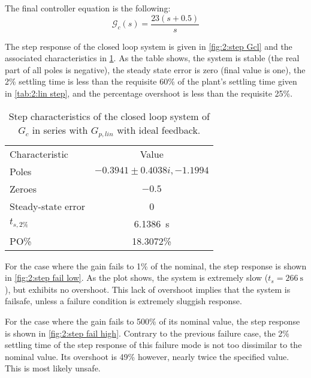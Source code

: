 The final controller equation is the following:
\begin{equation}
	\label{eq:2:Gc}
	\mathcal{G}_c(s) = \frac{23(s+0.5)}{s}
\end{equation}

The step response of the closed loop system is given in \cref{fig:2:step Gcl} and the associated characteristics in \cref{tab:2:step Gcl}. As the table shows, the system is stable (the real part of all poles is negative), the steady state error is zero (final value is one), the 2\% settling time is less than the requisite 60\% of the plant's settling time given in \cref{tab:2:lin step}, and the percentage overshoot is less than the requisite 25\%.

\begin{table}[h]
	\centering
	\begin{tabular}{lc}
		\toprule
		Characteristic&Value\\
		\cmidrule(r){1-1}\cmidrule(l){2-2}
		Poles&$-0.3941\pm\num{0.4038i},-1.1994$\\
		Zeroes&$-0.5$\\
		Steady-state error&0\\
		$t_{s,2\%}$&\SI{6.1386}{\second}\\
		PO\%&18.3072\%\\
		\bottomrule
	\end{tabular}
	\caption{Step characteristics of the closed loop system of $G_c$ in series with $G_{p,lin}$ with ideal feedback.}
	\label{tab:2:step Gcl}
\end{table}


For the case where the gain fails to 1\% of the nominal, the step response is shown in \cref{fig:2:step fail low}. As the plot shows, the system is extremely slow ($t_s=\SI{266}{\second}$), but exhibits no overshoot. This lack of overshoot implies that the system is failsafe, unless a failure condition is extremely sluggish response.

For the case where the gain fails to 500\% of its nominal value, the step response is shown in \cref{fig:2:step fail high}. Contrary to the previous failure case, the 2\% settling time of the step response of this failure mode is not too dissimilar to the nominal value. Its overshoot is 49\% however, nearly twice the specified value. This is most likely unsafe.

